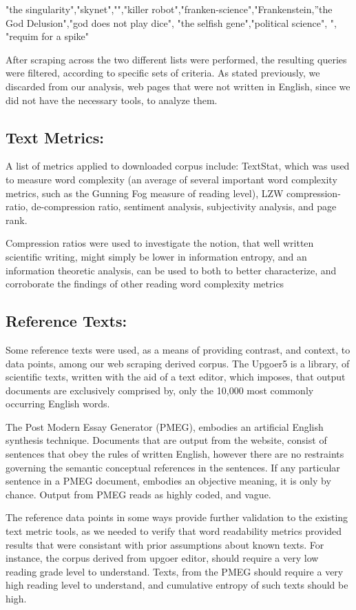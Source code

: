 \documentclass{clv3}
\begin{document}
"the singularity","skynet","","killer robot","franken-science","Frankenstein,”the God Delusion","god does not play dice", "the selfish gene","political science", ", "requim for a spike"


After scraping across the two different lists were performed, the resulting queries were filtered, according to specific sets of criteria. As stated previously, we discarded from our analysis, web pages that were not written in English, since we did not have the necessary tools, to analyze them.

\subsection{Text Metrics:}
A list of metrics applied to downloaded corpus include: TextStat, which was used to measure word complexity (an average of several important word complexity metrics, such as the Gunning Fog measure of reading level), LZW compression-ratio, de-compression ratio, sentiment analysis, subjectivity analysis, and page rank.

Compression ratios were used to investigate the notion, that well written scientific writing, might simply be lower in information entropy, and an information theoretic analysis, can be used to both to better characterize, and corroborate the findings of other reading word complexity metrics

\subsection{Reference Texts:}

Some reference texts were used, as a means of providing contrast, and context, to data points, among our web scraping derived corpus. The Upgoer5 is a library, of scientific texts, written with the aid of a text editor, which imposes, that output documents are exclusively comprised by, only the 10,000 most commonly occurring English words.

The Post Modern Essay Generator (PMEG), embodies an artificial English synthesis technique. Documents that are output from the website, consist of sentences that obey the rules of written English, however there are no restraints governing the semantic conceptual references in the sentences. If any particular sentence in a PMEG document, embodies an objective meaning, it is only by chance. Output from PMEG reads as highly coded, and vague.

The reference data points in some ways provide further validation to the existing text metric tools, as we needed to verify that word readability metrics provided results that were consistant with prior assumptions about known texts. For instance, the corpus derived from upgoer editor, should require a very low reading grade level to understand. Texts, from the PMEG should require a very high reading level to understand, and cumulative entropy of such texts should be high.
\end{document}

